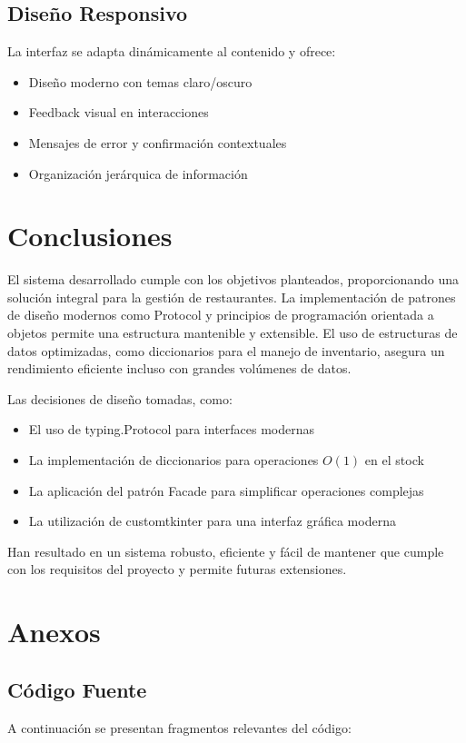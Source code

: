 \documentclass[12pt,letterpaper]{article}
\begin{document}
\subsection{Diseño Responsivo}
La interfaz se adapta dinámicamente al contenido y ofrece:
\begin{itemize}
    \item Diseño moderno con temas claro/oscuro
    \item Feedback visual en interacciones
    \item Mensajes de error y confirmación contextuales
    \item Organización jerárquica de información
\end{itemize}

\section{Conclusiones}
El sistema desarrollado cumple con los objetivos planteados, proporcionando una solución integral para la gestión de restaurantes. La implementación de patrones de diseño modernos como Protocol y principios de programación orientada a objetos permite una estructura mantenible y extensible. El uso de estructuras de datos optimizadas, como diccionarios para el manejo de inventario, asegura un rendimiento eficiente incluso con grandes volúmenes de datos.

Las decisiones de diseño tomadas, como:
\begin{itemize}
    \item El uso de typing.Protocol para interfaces modernas
    \item La implementación de diccionarios para operaciones $O(1)$ en el stock
    \item La aplicación del patrón Facade para simplificar operaciones complejas
    \item La utilización de customtkinter para una interfaz gráfica moderna
\end{itemize}

Han resultado en un sistema robusto, eficiente y fácil de mantener que cumple con los requisitos del proyecto y permite futuras extensiones.

\section{Anexos}
\subsection{Código Fuente}
A continuación se presentan fragmentos relevantes del código:
\end{document}
